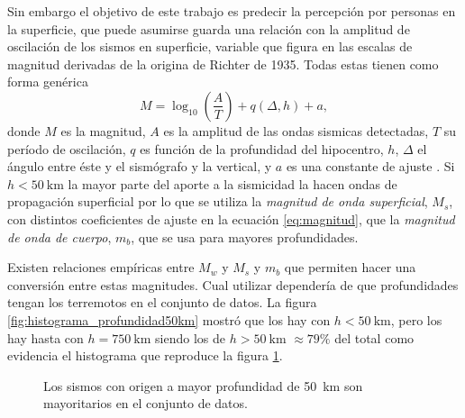 \documentclass[a4paper]{report}
\begin{document}
Sin embargo el objetivo de este trabajo es predecir la percepción por personas en la superficie, que puede asumirse guarda una relación con la amplitud de oscilación de los sismos en superficie, variable que figura en las escalas de magnitud derivadas de la origina de Richter de 1935.
Todas estas tienen como forma genérica
\begin{equation}
	M = \log_{10} \left( \frac{A}{T} \right) + q(\Delta, h) + a,
	\label{eq:magnitud}
\end{equation}
donde \(M\) es la magnitud, \(A\) es la amplitud de las ondas sismicas detectadas, \(T\) su período de oscilación, \(q\) es función de la profundidad del hipocentro, \(h\), \(\Delta\) el ángulo entre éste y el sismógrafo y la vertical, y \(a\) es una constante de ajuste \cite[ecuación 4.13]{fowler_solid_1990}.
Si \(h< \SI{50}{\kilo\metre}\) la mayor parte del aporte a la sismicidad la hacen ondas de propagación superficial por lo que se utiliza la \emph{magnitud de onda superficial}, \(M_s\), con distintos coeficientes de ajuste en la ecuación \ref{eq:magnitud}, que la \emph{magnitud de onda de cuerpo}, \(m_b\), que se usa para mayores profundidades.

Existen relaciones empíricas entre \(M_w\) y \(M_s\) y \(m_b\) que permiten hacer una conversión entre estas magnitudes.
Cual utilizar dependería de que profundidades tengan los terremotos en el conjunto de datos.
La figura \ref{fig:histograma_profundidad50km} mostró que los hay con \(h < \SI{50}{\kilo\metre}\), pero los hay hasta con \(h= \SI{750}{\kilo\metre}\) siendo los de \(h > \SI{50}{\kilo\metre}\) \(\approx 79\%\) del total como evidencia el histograma que reproduce la figura \ref{fig:histograma_profundidad750km}.

\begin{figure}[!ht]
	\centering
	
  \vspace{-1cm} %
	\caption{Los sismos con origen a mayor profundidad de \SI{50}{\kilo\metre} son mayoritarios en el conjunto de datos.}
	\label{fig:histograma_profundidad750km}
\end{figure}
\end{document}
